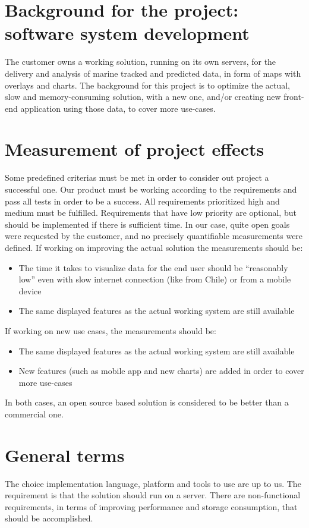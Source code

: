 \documentclass[11pt,a4paper,titlepage,oneside]{report}
\begin{document}
\section{Background for the project: software system development}
The customer owns a working solution, running on its own servers, for the delivery and analysis of marine tracked and predicted data, in form of maps with overlays and charts.
The background for this project is to optimize the actual, slow and memory-consuming solution, with a new one, and/or creating new front-end application using those data, to cover more use-cases.

\section{Measurement of project effects}
Some predefined criterias must be met in order to consider out project a successful one. Our product must be working according to the requirements and pass all tests in order to be a success. All requirements prioritized high and medium must be fulfilled. Requirements that have low priority are optional, but should be implemented if there is sufficient time.
In our case, quite open goals were requested by the customer, and no precisely quantifiable measurements were defined.
If working on improving the actual solution the measurements should be:
\begin{itemize}
\item The time it takes to visualize data for the end user should be “reasonably low” even with slow internet connection (like from Chile) or from a mobile device
\item The same displayed features as the actual working system are still available
\end{itemize}
If working on new use cases, the measurements should be:
\begin{itemize}
\item The same displayed features as the actual working system are still available
\item New features (such as mobile app and new charts) are added in order to cover more use-cases 
\end{itemize}
In both cases, an open source based solution is considered to be better than a commercial one.

\section{General terms}
The choice implementation language, platform and tools to use are up to us. The requirement is that the solution should run on a server.
There are non-functional requirements, in terms of improving performance and storage consumption, that should be accomplished.
\end{document}
